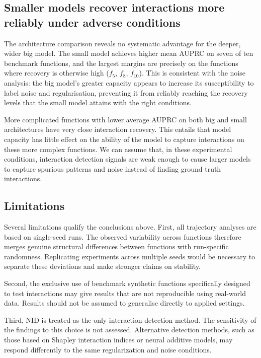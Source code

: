 \documentclass{article}
\begin{document}
\subsection*{Smaller models recover interactions more reliably under adverse conditions}

The architecture comparison reveals no systematic advantage for the deeper, wider big model. The small model achieves higher mean AUPRC on seven of ten benchmark functions, and the largest margins are precisely on the functions where recovery is otherwise high ($f_5$, $f_8$, $f_{10}$). This is consistent with the noise analysis: the big model's greater capacity appears to increase its susceptibility to label noise and regularisation, preventing it from reliably reaching the recovery levels that the small model attains with the right conditions.

More complicated functions with lower average AUPRC on both big and small architectures have very close interaction recovery. This entails that model capacity has little effect on the ability of the model to capture interactions on these more complex functions. We can assume that, in these experimental conditions, interaction detection signals are weak enough to cause larger models to capture spurious patterns and noise instead of finding ground truth interactions.

\subsection*{Limitations}

Several limitations qualify the conclusions above. First, all trajectory analyses are based on single-seed runs. The observed variability across functions therefore merges genuine structural differences between functions with run-specific randomness. Replicating experiments across multiple seeds would be necessary to separate these deviations and make stronger claims on stability.

Second, the exclusive use of benchmark synthetic functions specifically designed to test interactions may give results that are not reproducible using real-world data. Results should not be assumed to generalise directly to applied settings.

Third, NID is treated as the only interaction detection method. The sensitivity of the findings to this choice is not assessed. Alternative detection methods, such as those based on Shapley interaction indices or neural additive models, may respond differently to the same regularization and noise conditions.
\end{document}
